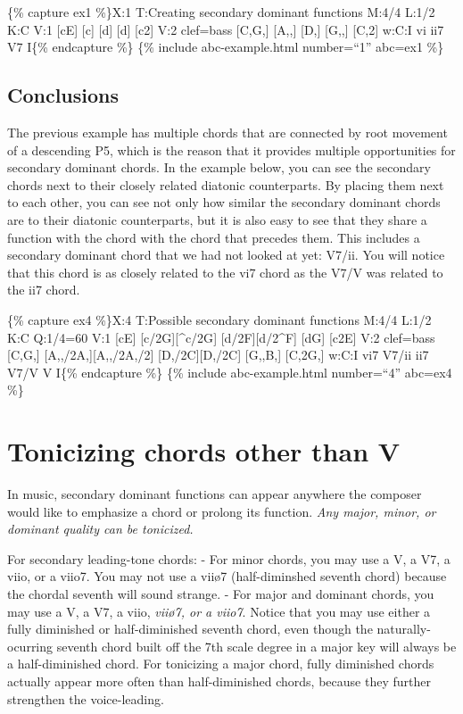 \documentclass{book}
\begin{document}
\{\% capture ex1 \%\}X:1 T:Creating secondary dominant functions M:4/4 L:1/2
K:C V:1 {[}cE{]} {[}c{]}\textbar{} {[}d{]} {[}d{]}\textbar{}
{[}c2{]}\textbar{]} V:2 clef=bass {[}C,G,{]} {[}A,,{]}\textbar{} {[}D,{]}
{[}G,,{]}\textbar{} {[}C,2{]}\textbar{]} w:C:I vi ii7 V7 I\{\% endcapture \%\}
\{\% include abc-example.html number=``1'' abc=ex1 \%\}

\hypertarget{conclusions-11}{%
\subsection{Conclusions}\label{conclusions-11}}

The previous example has multiple chords that are connected by root movement
of a descending P5, which is the reason that it provides multiple
opportunities for secondary dominant chords. In the example below, you can see
the secondary chords next to their closely related diatonic counterparts. By
placing them next to each other, you can see not only how similar the
secondary dominant chords are to their diatonic counterparts, but it is also
easy to see that they share a function with the chord with the chord that
precedes them. This includes a secondary dominant chord that we had not looked
at yet: V7/ii. You will notice that this chord is as closely related to the
vi7 chord as the V7/V was related to the ii7 chord.

\{\% capture ex4 \%\}X:4 T:Possible secondary dominant functions M:4/4 L:1/2
K:C Q:1/4=60 V:1 {[}cE{]} {[}c/2G{]}{[}\^{}c/2G{]}\textbar{}
{[}d/2F{]}{[}d/2\^{}F{]} {[}dG{]}\textbar{} {[}c2E{]}\textbar{]} V:2 clef=bass
{[}C,G,{]} {[}A,,/2A,{]}{[}A,,/2A,/2{]}\textbar{} {[}D,/2C{]}{[}D,/2C{]}
{[}G,,B,{]}\textbar{} {[}C,2G,{]}\textbar{]} w:C:I vi7 V7/ii ii7 V7/V V I\{\%
endcapture \%\} \{\% include abc-example.html number=``4'' abc=ex4 \%\}

\hypertarget{tonicizing-chords-other-than-v}{%
\section{Tonicizing chords other than
V}\label{tonicizing-chords-other-than-v}}

In music, secondary dominant functions can appear anywhere the composer would
like to emphasize a chord or prolong its function. \emph{Any major, minor, or
dominant quality can be tonicized.}

For secondary leading-tone chords: - For minor chords, you may use a V, a V7,
a viio, or a viio7. You may not use a viiø7 (half-diminshed seventh chord)
because the chordal seventh will sound strange. - For major and dominant
chords, you may use a V, a V7, a viio, \emph{viiø7, or a viio7}. Notice that
you may use either a fully diminished or half-diminished seventh chord, even
though the naturally-ocurring seventh chord built off the 7th scale degree in
a major key will always be a half-diminished chord. For tonicizing a major
chord, fully diminished chords actually appear more often than half-diminished
chords, because they further strengthen the voice-leading.
\end{document}
